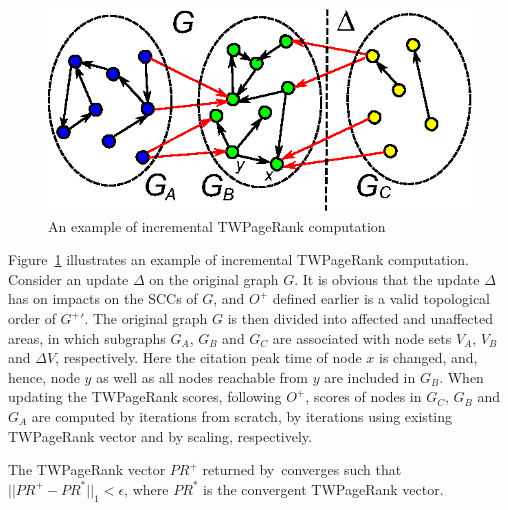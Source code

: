 \begin{figure}[tb!]
\centering
\includegraphics[scale=0.6]{fig/General_framework_peak.eps}
\vspace{-3.5ex}
\caption{\small An example of incremental TWPageRank computation}
\label{fig-inc-division}
\vspace{-4ex}
\end{figure}

\begin{example} \label{eg-layer-dag}
Figure~\ref{fig-inc-division} illustrates an example of incremental TWPageRank computation. Consider an update $\Delta$ on the original graph $G$.
%
It is obvious that the update $\Delta$ has on impacts on the SCCs of $G$, and $O^+$ defined earlier is a valid topological order of $G^+{'}$.
%
The original graph $G$ is then divided into affected and unaffected areas, in which subgraphs $G_A$, $G_B$ and $G_C$ are associated with node sets $V_A$, $V_B$ and $\Delta V$, respectively. Here the citation peak time of node $x$ is changed, and, hence, node $y$ as well as all nodes reachable from $y$ are included in $G_B$.
%
When updating the TWPageRank scores, following $O^+$, scores of nodes in $G_C$, $G_B$ and $G_A$ are computed by iterations from scratch, by iterations using existing TWPageRank vector and by scaling, respectively.
\end{example}

\begin{theorem}
\label{lemma-subgraphA}
The TWPageRank vector $PR^+$ returned by~\inctwprscc converges such that $||PR^+-PR^{*}||_1 < \epsilon$, where $PR^{*}$ is the convergent TWPageRank vector.
\end{theorem}

